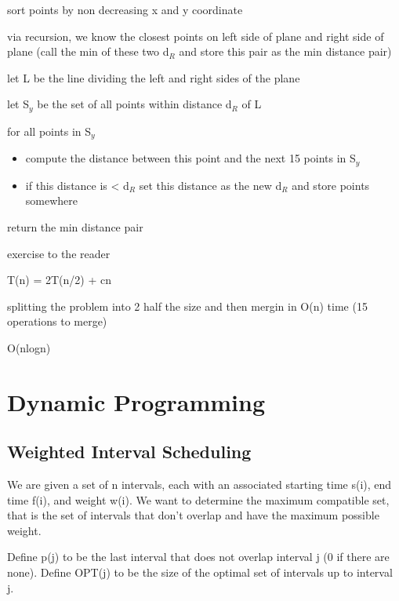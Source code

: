 \algorithm
{
    \item sort points by non decreasing x and y coordinate 
    \item via recursion, we know the closest points on left side of plane and right side of plane (call the min of these two d$_{R}$ and store this pair as the min distance pair)
    \item let L be the line dividing the left and right sides of the plane
    \item let S$_{y}$ be the set of all points within distance d$_{R}$ of L
    \item for all points in S$_{y}$
    \begin{itemize}
        \item compute the distance between this point and the next 15 points in S$_{y}$
        \item if this distance is < d$_{R}$ set this distance as the new d$_{R}$ and store points somewhere
    \end{itemize}
    \item return the min distance pair
}
{
    \item exercise to the reader
}
{
    \item T(n) = 2T(n/2) + cn 
    \item splitting the problem into 2 half the size and then mergin in O(n) time (15 operations to merge)
    \item O(nlogn)

}


\chapter{Dynamic Programming}

\section{Weighted Interval Scheduling}
We are given a set of n intervals, each with an associated starting time s(i), end time f(i), and weight w(i). We want to determine the maximum compatible set, that is the set of intervals that don't overlap and have the maximum possible weight.
 
Define p(j) to be the last interval that does not overlap interval j (0 if there are none). Define OPT(j) to be the size of the optimal set of intervals up to interval j.

